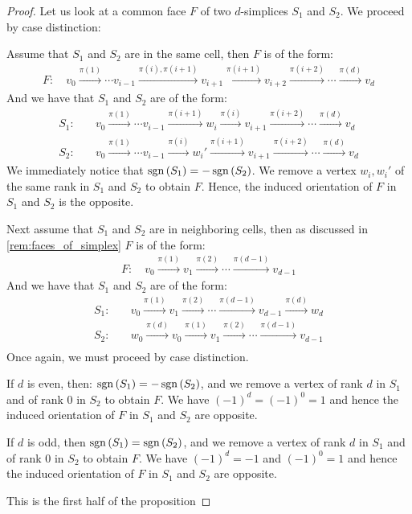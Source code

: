 \begin{proof}
	Let us look at a common face $F$ of two $d$-simplices $S_1$ and $S_2$. We proceed by case distinction:
	\begin{case}{1}
		Assume that $S_1$ and $S_2$ are in the same cell, then $F$ is of the form:
		\begin{align*}
			F: \quad v_0 \xrightarrow{\pi(1)}  \cdots v_{i-1} \xrightarrow{\pi(i), \pi(i+1)} v_{i+1} \xrightarrow{\pi(i+1)} v_{i+2} \xrightarrow{\pi(i+2)} \cdots \xrightarrow{\pi(d)} v_d
		\end{align*}
		And we have that $S_1$ and $S_2$ are of the form:
		\begin{align*}
			S_1: \quad & v_0 \xrightarrow{\pi(1)} \cdots v_{i-1} \xrightarrow{\pi(i+1)} w_i \xrightarrow{\pi(i)} v_{i+1} \xrightarrow{\pi(i+2)} \cdots \xrightarrow{\pi(d)} v_d  \\
			S_2: \quad & v_0 \xrightarrow{\pi(1)} \cdots v_{i-1} \xrightarrow{\pi(i)} w_i' \xrightarrow{\pi(i+1)} v_{i+1} \xrightarrow{\pi(i+2)} \cdots \xrightarrow{\pi(d)} v_d
		\end{align*}
		We immediately notice that $\operatorname{sgn}\left(S_1\right) = - \operatorname{sgn}\left(S_2\right)$. We remove a vertex $w_i, w_i'$ of the same rank in $S_1$ and $S_2$ to obtain $F$. Hence, the induced orientation of $F$ in $S_1$ and $S_2$ is the opposite.
	\end{case}
	\begin{case}{2}
		Next assume that $S_1$ and $S_2$ are in neighboring cells, then as discussed in \cref{rem:faces_of_simplex} $F$ is of the form:
		\begin{align*}
			F: \quad v_0 \xrightarrow{\pi(1)} v_1 \xrightarrow{\pi(2)} \cdots \xrightarrow{\pi(d-1)} v_{d-1}
		\end{align*}
		And we have that $S_1$ and $S_2$ are of the form:
		\begin{align*}
			S_1: & \quad v_0 \xrightarrow{\pi(1)} v_1 \xrightarrow{\pi(2)} \cdots \xrightarrow{\pi(d-1)} v_{d-1} \xrightarrow{\pi(d)} w_d \\
			S_2: & \quad w_0 \xrightarrow{\pi(d)} v_0 \xrightarrow{\pi(1)} v_1 \xrightarrow{\pi(2)} \cdots \xrightarrow{\pi(d-1)} v_{d-1} \\
		\end{align*}
		Once again, we must proceed by case distinction.
		\begin{case}{2.1}
			If $d$ is even, then: $\operatorname{sgn}\left(S_1\right) = - \operatorname{sgn}\left(S_2\right)$, and we remove a vertex of rank $d$ in $S_1$ and of rank $0$ in $S_2$ to obtain $F$. We have ${(-1)}^d = {(-1)}^0 = 1$ and hence the induced orientation of $F$ in $S_1$ and $S_2$ are opposite.
		\end{case}
		\begin{case}{2.2}
			If $d$ is odd, then $\operatorname{sgn}\left(S_1\right) = \operatorname{sgn}\left(S_2\right)$, and we remove a vertex of rank $d$ in $S_1$ and of rank $0$ in $S_2$ to obtain $F$. We have ${(-1)}^d = -1$ and ${(-1)}^0 = 1$ and hence the induced orientation of $F$ in $S_1$ and $S_2$ are opposite.
		\end{case}
	\end{case}
	This is the first half of the proposition
\end{proof}

